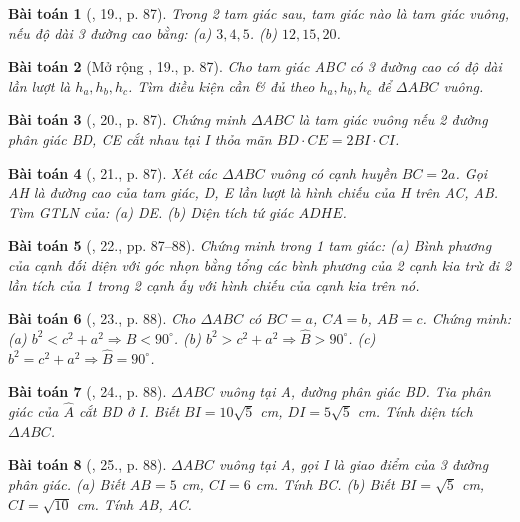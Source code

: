 \documentclass{article}
\newtheorem{baitoan}{Bài toán}
\begin{document}
\begin{baitoan}[\cite{Binh_Toan_9_tap_1}, 19., p. 87]
	Trong 2 tam giác sau, tam giác nào là tam giác vuông, nếu độ dài 3 đường cao bằng: (a) $3,4,5$. (b) $12,15,20$.
\end{baitoan}


\begin{baitoan}[Mở rộng \cite{Binh_Toan_9_tap_1}, 19., p. 87]
	Cho tam giác ABC có 3 đường cao có độ dài lần lượt là $h_a,h_b,h_c$. Tìm điều kiện cần \& đủ theo $h_a,h_b,h_c$ để $\Delta ABC$ vuông.
\end{baitoan}

\begin{baitoan}[\cite{Binh_Toan_9_tap_1}, 20., p. 87]
	Chứng minh $\Delta ABC$ là tam giác vuông nếu 2 đường phân giác BD, CE cắt nhau tại I thỏa mãn $BD\cdot CE = 2BI\cdot CI$.
\end{baitoan}

\begin{baitoan}[\cite{Binh_Toan_9_tap_1}, 21., p. 87]
	Xét các $\Delta ABC$ vuông có cạnh huyền $BC = 2a$. Gọi AH là đường cao của tam giác, D, E lần lượt là hình chiếu của H trên AC, AB. Tìm {\rm GTLN} của: (a) DE. (b) Diện tích tứ giác $ADHE$.
\end{baitoan}

\begin{baitoan}[\cite{Binh_Toan_9_tap_1}, 22., pp. 87--88]
	Chứng minh trong 1 tam giác: (a) Bình phương của cạnh đối diện với góc nhọn bằng tổng các bình phương của 2 cạnh kia trừ đi 2 lần tích của 1 trong 2 cạnh ấy với hình chiếu của cạnh kia trên nó.
\end{baitoan}

\begin{baitoan}[\cite{Binh_Toan_9_tap_1}, 23., p. 88]
	Cho $\Delta ABC$ có $BC = a$, $CA = b$, $AB = c$. Chứng minh: (a) $b^2 < c^2 + a^2\Rightarrow\widehat{B} < 90^\circ$. (b) $b^2 > c^2 + a^2\Rightarrow\widehat{B} > 90^\circ$. (c) $b^2 = c^2 + a^2\Rightarrow\widehat{B} = 90^\circ$.
\end{baitoan}

\begin{baitoan}[\cite{Binh_Toan_9_tap_1}, 24., p. 88]
	$\Delta ABC$ vuông tại A, đường phân giác BD. Tia phân giác của $\widehat{A}$ cắt BD ở I. Biết $BI = 10\sqrt{5}$ {\rm cm}, $DI = 5\sqrt{5}$ {\rm cm}. Tính diện tích $\Delta ABC$.
\end{baitoan}

\begin{baitoan}[\cite{Binh_Toan_9_tap_1}, 25., p. 88]
	$\Delta ABC$ vuông tại A, gọi I là giao điểm của 3 đường phân giác. (a) Biết $AB = 5$ {\rm cm}, $CI = 6$ {\rm cm}. Tính BC. (b) Biết $BI = \sqrt{5}$ {\rm cm}, $CI = \sqrt{10}$ {\rm cm}. Tính AB, AC.
\end{baitoan}
\end{document}
